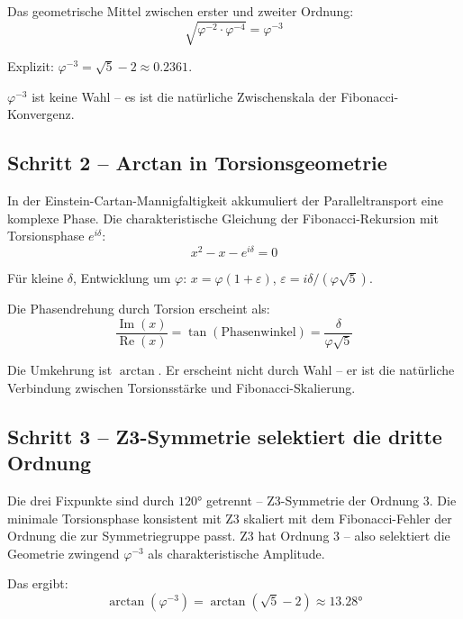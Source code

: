 \documentclass[12pt, a4paper]{article}
\begin{document}
Das geometrische Mittel zwischen erster und zweiter Ordnung:
\begin{equation}
  \sqrt{\varphi^{-2} \cdot \varphi^{-4}} = \varphi^{-3}
\end{equation}

Explizit: $\varphi^{-3} = \sqrt{5} - 2 \approx 0.2361$.

$\varphi^{-3}$ ist keine Wahl -- es ist die natürliche Zwischenskala der Fibonacci-Konvergenz.

\subsection{Schritt 2 -- Arctan in Torsionsgeometrie}

In der Einstein-Cartan-Mannigfaltigkeit akkumuliert der Paralleltransport eine komplexe Phase. Die charakteristische Gleichung der Fibonacci-Rekursion mit Torsionsphase $e^{i\delta}$:
\begin{equation}
  x^2 - x - e^{i\delta} = 0
\end{equation}

Für kleine $\delta$, Entwicklung um $\varphi$: $x = \varphi(1 + \varepsilon)$, $\varepsilon = i\delta/(\varphi\sqrt{5})$.

Die Phasendrehung durch Torsion erscheint als:
\begin{equation}
  \frac{\operatorname{Im}(x)}{\operatorname{Re}(x)} = \tan(\text{Phasenwinkel}) = \frac{\delta}{\varphi\sqrt{5}}
\end{equation}

Die Umkehrung ist $\arctan$. Er erscheint nicht durch Wahl -- er ist die natürliche Verbindung zwischen Torsionsstärke und Fibonacci-Skalierung.

\subsection{Schritt 3 -- Z3-Symmetrie selektiert die dritte Ordnung}

Die drei Fixpunkte sind durch $120°$ getrennt -- Z3-Symmetrie der Ordnung 3. Die minimale Torsionsphase konsistent mit Z3 skaliert mit dem Fibonacci-Fehler der Ordnung die zur Symmetriegruppe passt. Z3 hat Ordnung 3 -- also selektiert die Geometrie zwingend $\varphi^{-3}$ als charakteristische Amplitude.

Das ergibt:
\begin{equation}
  \boxed{\arctan(\varphi^{-3}) = \arctan(\sqrt{5} - 2) \approx 13.28°}
\end{equation}
\end{document}
